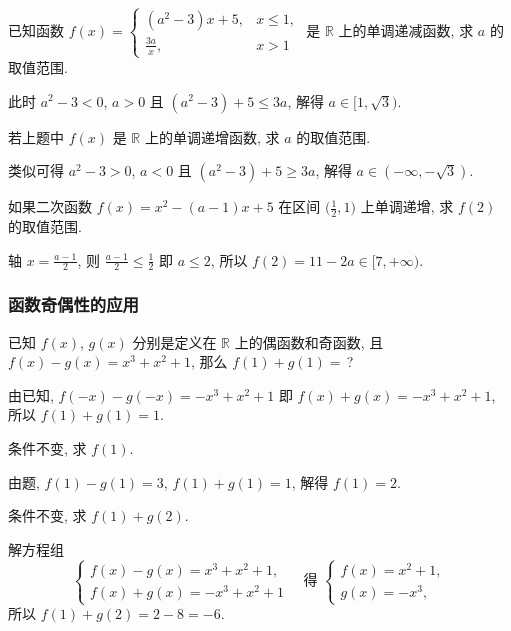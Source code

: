     \varexercise 已知函数 $f(x)=\begin{cases}
      (a^2-3)x+5, & x\leqslant 1,\\
      \frac{3a}x, & x>1 \end{cases}$ 
    是 $\mathbb{R}$ 上的单调递减函数, 求 $a$ 的取值范围.
    
    此时 $a^2-3<0$, $a>0$ 且 $(a^2-3)+5\leqslant 3a$, 解得 $a\in[1,\sqrt3)$.
    
    \varexercise 若上题中 $f(x)$ 是 $\mathbb{R}$ 上的单调递增函数, 求 $a$ 的取值范围.
    
    类似可得 $a^2-3>0$, $a<0$ 且 $(a^2-3)+5\geqslant 3a$, 解得 $a\in(-\infty,-\sqrt3)$.
  \endsolution
  
  \lianxi
  \begin{exercise}[s]
    如果二次函数 $f(x)=x^2 -(a-1)x+5$ 在区间 $\Big(\frac12,1\Big)$ 上单调递增,
    求 $f(2)$ 的取值范围.
  \end{exercise}

  \beginsolution
    轴 $x=\frac{a-1}2$, 则 $\frac{a-1}2\leqslant \frac12$ 即 $a\leqslant 2$, 所以 $f(2)= 11-2a\in[7,+\infty)$.
  \endsolution
  
  \subsubsection{函数奇偶性的应用}
  \begin{example}
    已知 $f(x)$, $g(x)$ 分别是定义在 $\mathbb{R}$ 上的偶函数和奇函数,
    且 $f(x)-g(x)= x^3 +x^2 +1$, 那么 $f(1)+g(1)=$\,?
  \end{example}

  \beginsolution
    由已知, $f(-x)-g(-x)=-x^3+x^2+1$ 即 $f(x)+g(x)=-x^3+x^2+1$, 所以 $f(1)+g(1)=1$.
    
    \varexercise 条件不变, 求 $f(1)$.
    
    由题, $f(1)-g(1)=3$, $f(1)+g(1)=1$, 解得 $f(1)=2$.
    
    \varexercise 条件不变, 求 $f(1)+g(2)$.
    
    解方程组
    \[\left\{\!\!\begin{array}{l}
        f(x)-g(x)= x^3 +x^2 +1,\\
        f(x)+g(x)=-x^3+x^2+1
      \end{array}\right. \quad \text{得\ } 
      \left\{\!\!\begin{array}{l}
        f(x)= x^2+1,\\
        g(x)= -x^3,
      \end{array}\right.\]
    所以 $f(1)+g(2)=2-8=-6$.
  \endsolution
  
